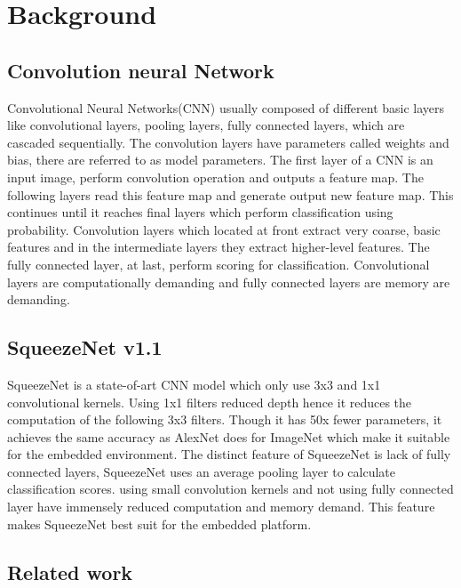 \documentclass[conference]{IEEEtran}
\begin{document}
\section{Background}
\subsection{Convolution neural Network}
Convolutional Neural Networks(CNN) usually composed of different basic layers like convolutional layers, pooling layers, fully connected layers, which are cascaded sequentially. The convolution layers have parameters called weights and bias, there are referred to as model parameters. The first layer of a CNN is an input image, perform convolution operation and outputs a feature map. The following layers read this feature map and generate output new feature map. This continues until it reaches final layers which perform classification using probability. Convolution layers which located at front extract very coarse, basic features and in the intermediate layers they extract higher-level features. The fully connected layer, at last, perform scoring for classification. Convolutional layers are computationally demanding and fully connected layers are memory are demanding. 

\subsection{SqueezeNet v1.1}
SqueezeNet is a state-of-art CNN model which only use 3x3 and 1x1 convolutional kernels. Using 1x1 filters reduced depth hence it reduces the computation of the following 3x3 filters. Though it has 50x fewer parameters, it achieves the same accuracy as AlexNet does for ImageNet which make it suitable for the embedded environment. The distinct feature of SqueezeNet is lack of fully connected layers, SqueezeNet uses an average pooling layer to calculate classification scores. using small convolution kernels and not using fully connected layer have immensely reduced computation and memory demand. This feature makes SqueezeNet best suit for the embedded platform.
\subsection{Related work}
\end{document}
